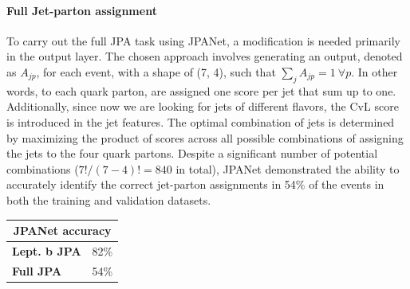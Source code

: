 \paragraph*{Full Jet-parton assignment}
To carry out the full JPA task using JPANet, a modification is needed primarily in the output layer. The chosen approach involves generating an output, denoted as $A_{jp}$,  for each event, with a shape of (7, 4), such that $\sum_j A_{jp}=1 \: \forall p$.
In other words, to each quark parton, are assigned one score per jet that sum up to one.
Additionally, since now we are looking for jets of different flavors, the \DeepJet CvL score is introduced in the jet features.
The optimal combination of jets is determined by maximizing the product of scores across all possible combinations of assigning the jets to the four quark partons.
Despite a significant number of potential combinations ($7!/(7-4)!=840$ in total), JPANet demonstrated the ability to accurately identify the correct jet-parton assignments in 54\% of the events in both the training and validation datasets.

\vspace{-0.2cm}
\begin{table}[H]
    \centering
    \fontsize{10.pt}{10.pt}\selectfont
    \begin{tabular}{l|c}
    \toprule
    \multicolumn{2}{c}{\textbf{JPANet accuracy}}\\
    \midrule
         \textbf{Lept. b JPA}& 82\%\\
         \textbf{Full JPA}& 54\%\\
    \end{tabular}
\end{table}




